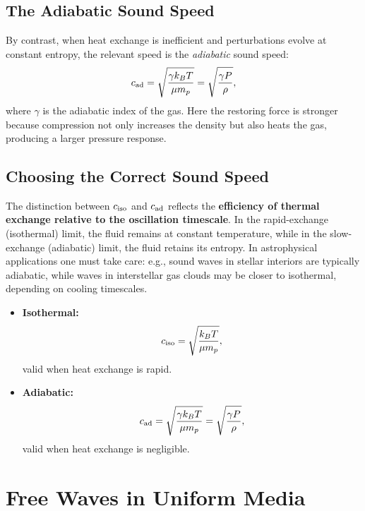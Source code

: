 \subsection*{The Adiabatic Sound Speed}

By contrast, when heat exchange is inefficient and perturbations evolve at constant
entropy, the relevant speed is the \emph{adiabatic} sound speed:
\begin{equation}
    c_{\rm ad} = \sqrt{\frac{\gamma k_B T}{\mu m_p}}
    = \sqrt{\frac{\gamma P}{\rho}},
\end{equation}
where $\gamma$ is the adiabatic index of the gas.  
Here the restoring force is stronger because compression not only increases the
density but also heats the gas, producing a larger pressure response.

\subsection*{Choosing the Correct Sound Speed}

The distinction between $c_{\rm iso}$ and $c_{\rm ad}$ reflects the 
\textbf{efficiency of thermal exchange relative to the oscillation timescale}.
In the rapid-exchange (isothermal) limit, the fluid remains at constant temperature,
while in the slow-exchange (adiabatic) limit, the fluid retains its entropy.  
In astrophysical applications one must take care: e.g., sound waves in stellar
interiors are typically adiabatic, while waves in interstellar gas clouds
may be closer to isothermal, depending on cooling timescales.

\begin{bigidea}
\begin{itemize}
    \item \textbf{Isothermal:} 
    \[
    c_{\rm iso} = \sqrt{\frac{k_B T}{\mu m_p}},
    \]
    valid when heat exchange is rapid.

    \item \textbf{Adiabatic:}
    \[
    c_{\rm ad} = \sqrt{\frac{\gamma k_B T}{\mu m_p}} 
    = \sqrt{\frac{\gamma P}{\rho}},
    \]
    valid when heat exchange is negligible.
\end{itemize}
\end{bigidea}


\section{Free Waves in Uniform Media}

